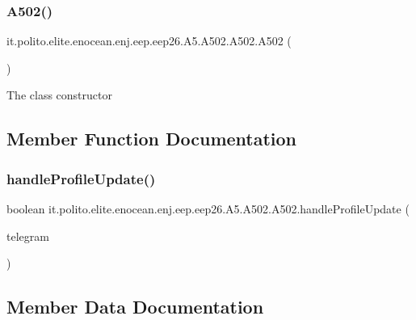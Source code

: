 \subsubsection{\texorpdfstring{A502()}{A502()}}
{\footnotesize\ttfamily it.\+polito.\+elite.\+enocean.\+enj.\+eep.\+eep26.\+A5.\+A502.\+A502.\+A502 (\begin{DoxyParamCaption}{ }\end{DoxyParamCaption})}

The class constructor 

\subsection{Member Function Documentation}
\hypertarget{classit_1_1polito_1_1elite_1_1enocean_1_1enj_1_1eep_1_1eep26_1_1_a5_1_1_a502_1_1_a502_a1d2b0d2847c7ff2c36cc5d7932360129}{}\label{classit_1_1polito_1_1elite_1_1enocean_1_1enj_1_1eep_1_1eep26_1_1_a5_1_1_a502_1_1_a502_a1d2b0d2847c7ff2c36cc5d7932360129} 
\subsubsection{\texorpdfstring{handle\+Profile\+Update()}{handleProfileUpdate()}}
{\footnotesize\ttfamily boolean it.\+polito.\+elite.\+enocean.\+enj.\+eep.\+eep26.\+A5.\+A502.\+A502.\+handle\+Profile\+Update (\begin{DoxyParamCaption}\item[{\hyperlink{classit_1_1polito_1_1elite_1_1enocean_1_1enj_1_1eep_1_1eep26_1_1telegram_1_1_e_e_p26_telegram}{E\+E\+P26\+Telegram}}]{telegram }\end{DoxyParamCaption})}



\subsection{Member Data Documentation}
\hypertarget{classit_1_1polito_1_1elite_1_1enocean_1_1enj_1_1eep_1_1eep26_1_1_a5_1_1_a502_1_1_a502_ac0e3047c50cf4649d7dd140855601cbc}{}\label{classit_1_1polito_1_1elite_1_1enocean_1_1enj_1_1eep_1_1eep26_1_1_a5_1_1_a502_1_1_a502_ac0e3047c50cf4649d7dd140855601cbc} 

